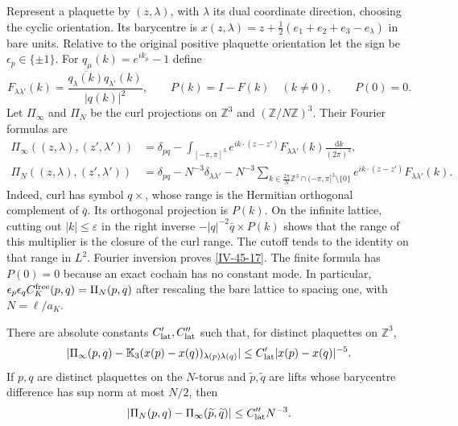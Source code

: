 \documentclass[11pt,letterpaper,reqno]{amsart}
\makeatletter
\theoremstyle{definition}
\newcommand{\ms@minorstart}{%
  \pushQED{\qed}\renewcommand{\qedsymbol}{$\blacksquare$}}
\newenvironment{lemma}[1][]{\ms@minorstart\ms@lemma[#1]}
  {\popQED\endms@lemma}
\theoremstyle{remark}
\makeatother
\begin{document}
Represent a plaquette by $(z,\lambda)$, with $\lambda$ its dual
coordinate direction, choosing the cyclic orientation.  Its
barycentre is $x(z,\lambda)=z+\frac12(e_1+e_2+e_3-e_\lambda)$
in bare units.  Relative to the original positive plaquette
orientation let the sign be $\epsilon_p\in\{\pm1\}$.
For $q_\mu(k)=e^{ik_\mu}-1$ define
\[
 F_{\lambda\lambda'}(k)
      =\frac{\overline{q_\lambda(k)}q_{\lambda'}(k)}{|q(k)|^2},
 \qquad P(k)=I-F(k)\quad(k\ne0),\qquad P(0)=0.
\]
Let $\Pi_\infty$ and $\Pi_N$ be the curl projections on
$\mathbb Z^3$ and $(\mathbb Z/N\mathbb Z)^3$.  Their Fourier
formulas are
\begin{equation}\label{IV-45-17}
 \begin{split}
 \Pi_\infty((z,\lambda),(z',\lambda'))
  &=\delta_{pq}-\int_{[-\pi,\pi]^3}
         e^{ik\cdot(z-z')}F_{\lambda\lambda'}(k)\frac{\,\mathrm{d}k}{(2\pi)^3},\\
 \Pi_N((z,\lambda),(z',\lambda'))
  &=\delta_{pq}-N^{-3}\delta_{\lambda\lambda'}
       -N^{-3}\sum_{k\in\frac{2\pi}N\mathbb Z^3\cap(-\pi,\pi]^3
                         \setminus\{0\}}
                         e^{ik\cdot(z-z')}F_{\lambda\lambda'}(k).
 \end{split}
\end{equation}
Indeed, curl has symbol $q\times$, whose range is the Hermitian
orthogonal complement of $\bar q$.  Its orthogonal projection is
$P(k)$.  On the infinite lattice, cutting out $|k|\le\varepsilon$
in the right inverse
$-|q|^{-2}\bar q\times P(k)$ shows that the range of this
multiplier is the closure of the curl range.  The cutoff tends
to the identity on that range in $L^2$.  Fourier inversion proves
\eqref{IV-45-17}.  The finite formula has $P(0)=0$ because
an exact cochain has no constant mode.  In particular,
$\epsilon_p\epsilon_q C^{\rm free}_K(p,q)=\Pi_N(p,q)$
after rescaling the bare lattice to spacing one, with $N=\ell/a_K$.

\begin{lemma}\label{IV-45-22}\label{IV-45-27}
There are absolute constants $C'_{\rm lat},C''_{\rm lat}$ such
that, for distinct plaquettes on $\mathbb Z^3$,
\begin{equation}\label{eq:infinite-dipole-error}
 |\Pi_\infty(p,q)-\mathbb K_3(x(p)-x(q))_{\lambda(p)\lambda(q)}|
                 \le C'_{\rm lat}|x(p)-x(q)|^{-5}.
\end{equation}
If $p,q$ are distinct plaquettes on the $N$-torus and
$\widetilde p,\widetilde q$ are lifts whose barycentre difference
has sup norm at most $N/2$, then
\begin{equation}\label{eq:periodic-dipole-error}
 |\Pi_N(p,q)-\Pi_\infty(\widetilde p,\widetilde q)|
                                      \le C''_{\rm lat}N^{-3}.
\end{equation}
\end{lemma}
\end{document}

